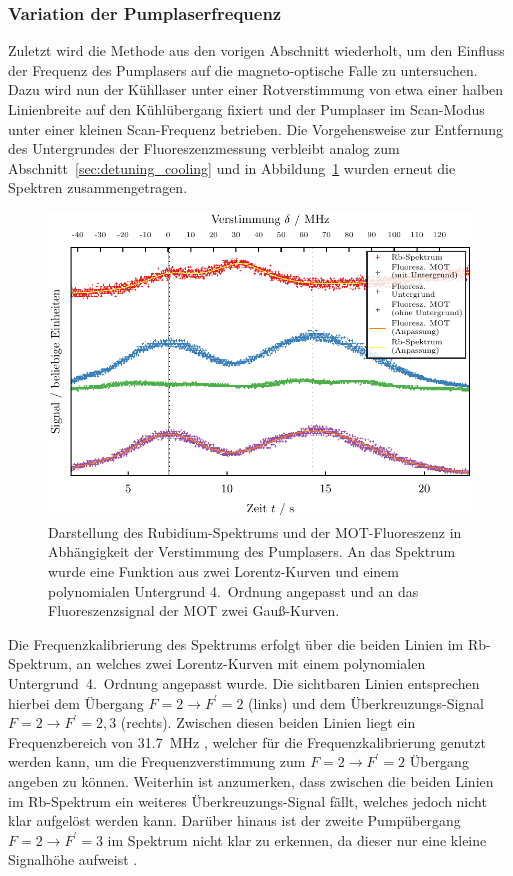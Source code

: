 \documentclass[11pt, a4paper]{article}
\numberwithin{equation}{section}
\begin{document}
\subsubsection{Variation der Pumplaserfrequenz}
Zuletzt wird die Methode aus den vorigen Abschnitt wiederholt, um den Einfluss der Frequenz des Pumplasers auf die magneto-optische Falle zu untersuchen.
Dazu wird nun der Kühllaser unter einer Rotverstimmung von etwa einer halben Linienbreite auf den Kühlübergang fixiert und der Pumplaser im Scan-Modus unter einer kleinen Scan-Frequenz betrieben.
Die Vorgehensweise zur Entfernung des Untergrundes der Fluoreszenzmessung verbleibt analog zum Abschnitt~\ref{sec:detuning_cooling} und in Abbildung~\ref{fig:detuning_repumping} wurden erneut die Spektren zusammengetragen.
\begin{figure}[h]
	\includegraphics{./figures/detuning_repumping.pdf}
	\caption{Darstellung des Rubidium-Spektrums und der MOT-Fluoreszenz in Abhängigkeit der Verstimmung des Pumplasers. An das Spektrum wurde eine Funktion aus zwei Lorentz-Kurven und einem polynomialen Untergrund 4.\ Ordnung angepasst und an das Fluoreszenzsignal der MOT zwei Gauß-Kurven.}
	\label{fig:detuning_repumping}
\end{figure}

Die Frequenzkalibrierung des Spektrums erfolgt über die beiden Linien im Rb-Spektrum, an welches zwei Lorentz-Kurven mit einem polynomialen Untergrund~4.\ Ordnung angepasst wurde.
Die sichtbaren Linien entsprechen hierbei dem Übergang $F=2 \rightarrow F^\prime=2$ (links) und dem Überkreuzungs-Signal $F=2 \rightarrow F^\prime=2,3$ (rechts).
Zwischen diesen beiden Linien liegt ein Frequenzbereich von \SI{31.7}{MHz} \cite{script}, welcher für die Frequenzkalibrierung genutzt werden kann, um die Frequenzverstimmung zum $F=2 \rightarrow F^\prime=2$ Übergang angeben zu können.
Weiterhin ist anzumerken, dass zwischen die beiden Linien im Rb-Spektrum ein weiteres Überkreuzungs-Signal fällt, welches jedoch nicht klar aufgelöst werden kann.
Darüber hinaus ist der zweite Pumpübergang $F=2 \rightarrow F^\prime=3$ im Spektrum nicht klar zu erkennen, da dieser nur eine kleine Signalhöhe aufweist \cite{script}.
\end{document}
